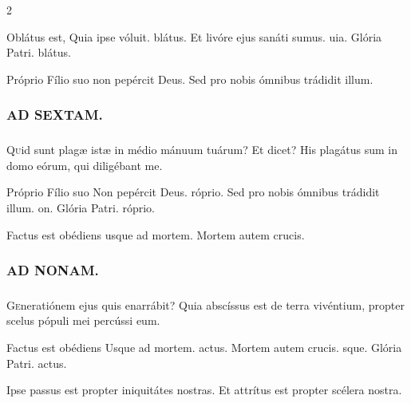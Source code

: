 \documentclass[9pt,twoside]{extarticle}
\begin{document}
\begin{multicols}{2}
\begin{tightlist}{}
\item {} Oblátus est, \textred{*} Quia ipse vóluit. blátus.  Et livóre ejus sanáti sumus. uia. Glória Patri. blátus. 
\item {} Próprio Fílio suo non pepércit Deus.  Sed pro nobis ómnibus trádidit illum.
\end{tightlist}

\subsubsection*{\center \textsc{AD SEXTAM.}}
\subsubsection*{}
\lettrine{Q}uid sunt plagæ istæ in médio mánuum tuárum? Et dicet? His plagátus sum in domo eórum, qui diligébant me.

\begin{tightlist}{}
\item {} Próprio Fílio suo \textred{*} Non pepércit Deus. róprio.  Sed pro nobis ómnibus trádidit illum. on. Glória Patri. róprio.
\item {} Factus est obédiens usque ad mortem.  Mortem autem crucis.
\end{tightlist}

\subsubsection*{\center \textsc{AD NONAM.}}
\subsubsection*{}
\lettrine{G}eneratiónem ejus quis enarrábit? Quia abscíssus est de terra vivéntium, propter scelus pópuli mei percússi eum.

\begin{tightlist}{}
\item {} Factus est obédiens \textred{*} Usque ad mortem. actus.  Mortem autem crucis. sque. Glória Patri. actus.
\item {} Ipse passus est propter iniquitátes nostras.  Et attrítus est propter scélera nostra.
\end{tightlist}


\end{multicols}
\end{document}
